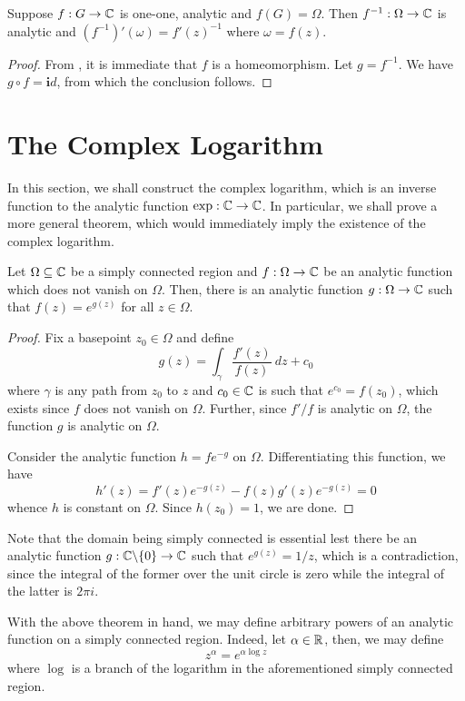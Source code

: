 \begin{corollary}
    Suppose $f: G\to\mathbb{C}$ is one-one, analytic and $f(G) = \Omega$. Then $f^{-1}:\Omega\to\mathbb{C}$ is analytic and $(f^{-1})'(\omega) = f'(z)^{-1}$ where $\omega = f(z)$.
\end{corollary}
\begin{proof}
    From , it is immediate that $f$ is a homeomorphism. Let $g = f^{-1}$. We have $g\circ f = \mathbf id$, from which the conclusion follows.
\end{proof}

\section{The Complex Logarithm}

In this section, we shall construct the complex logarithm, which is an inverse function to the analytic function $\exp:\mathbb{C}\to\mathbb{C}$. In particular, we shall prove a more general theorem, which would immediately imply the existence of the complex logarithm. 

\begin{theorem}
    Let $\Omega\subseteq\mathbb{C}$ be a simply connected region and $f:\Omega\to\mathbb{C}$ be an analytic function which does not vanish on $\Omega$. Then, there is an analytic function $g:\Omega\to\mathbb{C}$ such that $f(z) = e^{g(z)}$ for all $z\in\Omega$.
\end{theorem}
\begin{proof}
    Fix a basepoint $z_0\in\Omega$ and define 
    \begin{equation*}
        g(z) = \int_{\gamma}\frac{f'(z)}{f(z)}~dz + c_0
    \end{equation*}
    where $\gamma$ is any path from $z_0$ to $z$ and $c_0\in\mathbb{C}$ is such that $e^{c_0} = f(z_0)$, which exists since $f$ does not vanish on $\Omega$. Further, since $f'/f$ is analytic on $\Omega$, the function $g$ is analytic on $\Omega$. 

    Consider the analytic function $h = fe^{-g}$ on $\Omega$. Differentiating this function, we have 
    \begin{equation*}
        h'(z) = f'(z)e^{-g(z)} - f(z)g'(z)e^{-g(z)} = 0
    \end{equation*}
    whence $h$ is constant on $\Omega$. Since $h(z_0) = 1$, we are done.
\end{proof}

Note that the domain being simply connected is essential lest there be an analytic function $g:\mathbb{C}\backslash\{0\}\to\mathbb{C}$ such that $e^{g(z)} = 1/z$, which is a contradiction, since the integral of the former over the unit circle is zero while the integral of the latter is $2\pi i$.

With the above theorem in hand, we may define arbitrary powers of an analytic function on a simply connected region. Indeed, let $\alpha\in\mathbb{R}$, then, we may define 
\begin{equation*}
    z^\alpha = e^{\alpha\log z}
\end{equation*}
where $\log$ is a branch of the logarithm in the aforementioned simply connected region.